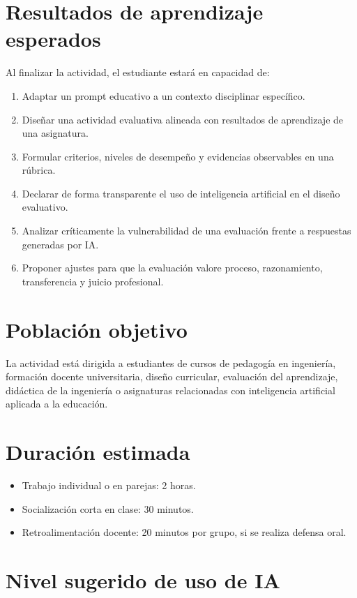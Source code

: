 \documentclass[12pt,letterpaper]{article}
\begin{document}
\section{Resultados de aprendizaje esperados}

Al finalizar la actividad, el estudiante estará en capacidad de:

\begin{enumerate}
  \item Adaptar un prompt educativo a un contexto disciplinar específico.
  \item Diseñar una actividad evaluativa alineada con resultados de
    aprendizaje de una asignatura.
  \item Formular criterios, niveles de desempeño y evidencias
    observables en una rúbrica.
  \item Declarar de forma transparente el uso de inteligencia
    artificial en el diseño evaluativo.
  \item Analizar críticamente la vulnerabilidad de una evaluación
    frente a respuestas generadas por IA.
  \item Proponer ajustes para que la evaluación valore proceso,
    razonamiento, transferencia y juicio profesional.
\end{enumerate}

\section{Población objetivo}

La actividad está dirigida a estudiantes de cursos de pedagogía en
ingeniería, formación docente universitaria, diseño curricular,
evaluación del aprendizaje, didáctica de la ingeniería o asignaturas
relacionadas con inteligencia artificial aplicada a la educación.

\section{Duración estimada}

\begin{itemize}
  \item Trabajo individual o en parejas: 2 horas.
  \item Socialización corta en clase: 30 minutos.
  \item Retroalimentación docente: 20 minutos por grupo, si se
    realiza defensa oral.
\end{itemize}

\section{Nivel sugerido de uso de IA}
\end{document}
